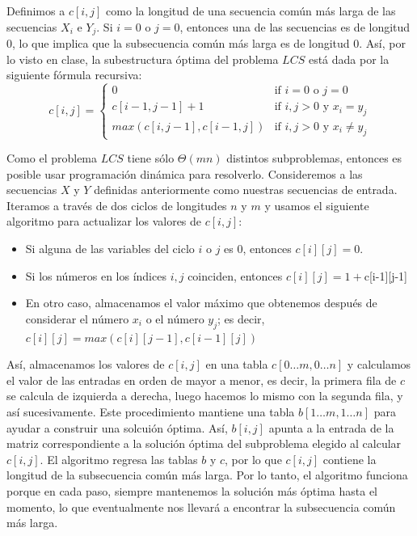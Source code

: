 \documentclass[letterpaper,11pt]{article}
\begin{document}
\begin{enumerate}
    Definimos a $c[i, j]$ como la longitud de una secuencia común más larga de 
    las secuencias $X_i$ e $Y_j$. Si $i = 0$ o $j = 0$, entonces una de las 
    secuencias es de longitud $0$, lo que implica que la subsecuencia común 
    más larga es de longitud $0$. Así, por lo visto en clase, la subestructura 
    óptima del problema $LCS$ está dada por la siguiente fórmula recursiva:
    \begin{equation*}
        c[i, j] =
        \left\{
            \begin{array}{ll}
                0 & \text{if $i = 0$ o $j = 0$} \\
                c[i-1, j-1] + 1 & \text{if $i, j > 0$ y $x_i = y_j$} \\
                max(c[i, j-1], c[i-1, j]) & \text{if $i, j > 0$ y $x_i \neq y_j$}
            \end{array}
        \right.
    \end{equation*}

    Como el problema $LCS$ tiene sólo $\Theta(mn)$ distintos subproblemas, 
    entonces es posible usar programación dinámica para resolverlo. Consideremos
    a las secuencias $X$ y $Y$ definidas anteriormente como nuestras secuencias 
    de entrada. Iteramos a través de dos ciclos de longitudes $n$ y $m$ y 
    usamos el siguiente algoritmo para actualizar los valores de $c[i,j]$:
    \begin{itemize}
        \item Si alguna de las variables del ciclo $i$ o $j$ es $0$, entonces 
        $c[i][j] = 0$.

        \item Si los números en los índices $i,j$ coinciden, entonces 
        $c[i][j] = 1 + $c[i-1][j-1]

        \item En otro caso, almacenamos el valor máximo que obtenemos después 
        de considerar el número $x_i$ o el número $y_j$; es decir, 
        $c[i][j] = max(c[i][j-1], c[i-1][j])$
    \end{itemize}
    
    Así, almacenamos los valores de $c[i,j]$ en una tabla $c[0 \ldots m, 
    0 \ldots n]$ y calculamos el valor de las entradas en orden de mayor a 
    menor, es decir, la primera fila de $c$ se calcula de izquierda a derecha, 
    luego hacemos lo mismo con la segunda fila, y así sucesivamente. Este 
    procedimiento mantiene una tabla $b[1 \ldots m, 1 \ldots n]$ para ayudar a 
    construir una solcuión óptima. Así, $b[i, j]$ apunta a la entrada de la 
    matriz correspondiente a la solución óptima del subproblema elegido al 
    calcular $c[i, j]$. El algoritmo regresa las tablas $b$ y $c$, por lo que 
    $c[i, j]$ contiene la longitud de la subsecuencia común más larga. 
    Por lo tanto, el algoritmo funciona porque en cada paso, siempre mantenemos 
    la solución más óptima hasta el momento, lo que eventualmente nos llevará a 
    encontrar la subsecuencia común más larga. 


\end{enumerate}
\end{document}
